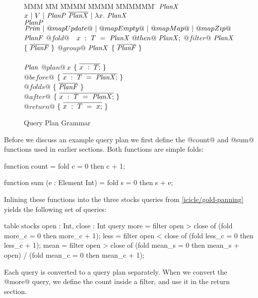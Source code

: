 \begin{figure}

\begin{tabbing}
MMM \= MM \= MMMM \= MMMM \= MMMMMM \= \kill
$\mathit{PlanX}$
\GrammarDefTab
  $x~|~V~|~\mathit{PlanP}~\overline{\mathit{PlanX}}~|~\lambda{}x.~\mathit{PlanX}$
\\
$\mathit{PlanP}$
\GrammarDefTab
  $\mathit{Prim}~|~@mapUpdate@~|~@mapEmpty@~|~@mapMap@~|~@mapZip@$
\\
$\mathit{PlanF}$
\GrammarDefTab
 $@fold@$ \> $~~x~:~T~=~\mathit{PlanX}~@then@~\mathit{PlanX};$
\GrammarAlt
 $@filter@$ \> $\mathit{PlanX}$ \> $\{~\overline{\mathit{PlanF}}~\}$
\GrammarAlt
  $@group@$ \> $\mathit{PlanX}$ \> $\{~\overline{\mathit{PlanF}}~\}$
\\
\\
$\mathit{Plan}$
\GrammarDefTab
  $@plan@~x$ \> $\{~\overline{x~:~T;}~\}$
\\
  \> \> $@before@$ \> $\{~\overline{x~:~T~=~\mathit{PlanX};}~\}$ \\
  \> \> $@folds@$  \> $\{~\overline{\mathit{PlanF}}~\}$ \\
  \> \> $@after@$  \> $\{~\overline{x~:~T~=~\mathit{PlanX};}~\}$ \\
  \> \> $@return@$ \> $\{~\overline{x~:~T~=~x;}~\}$ \\
\end{tabbing}



\caption{Query Plan Grammar}
\label{icicle:fig:core:grammar}
\end{figure}


Before we discuss an example query plan we first define the @count@ and @sum@ functions used in earlier sections.
Both functions are simple folds:
\begin{icicle}
function count
 = fold c = 0 then c + 1;

function sum (e : Element Int)
 = fold s = 0 then s + e;
\end{icicle}

Inlining these functions into the three stocks queries from \cref{icicle/gold-panning} yields the following set of queries:

\begin{icicle}
table stocks { open : Int, close : Int }
query 
  more = filter open > close of (fold more_c = 0 then more_c + 1);
  less = filter open < close of (fold less_c = 0 then less_c + 1);
  mean = filter open > close of
      (fold mean_s = 0 then mean_s + open) / (fold mean_c = 0 then mean_c + 1);
\end{icicle}

Each query is converted to a query plan separately.
When we convert the @more@ query, we define the count inside a filter, and use it in the return section.

